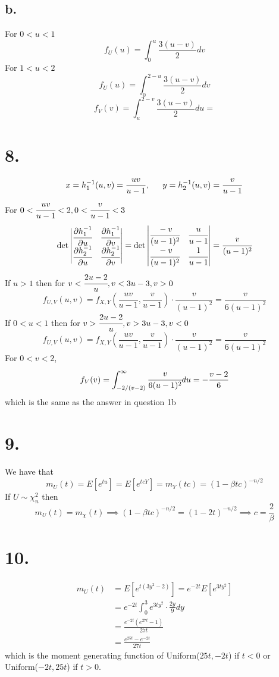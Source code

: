 \documentclass[11pt]{article}
\begin{document}
\subsection*{b.}
For $0<u<1$
\[
    f_U(u) =  \int_0^{u} \frac{3(u-v)}{2} dv
\]
For $1<u<2$
\[
    f_U(u) =  \int_0^{2-u} \frac{3(u-v)}{2} dv
\]
\[
    f_V(v) = \int_u^{2-v} \frac{3(u-v)}{2} du =
\]
\pagebreak
\section*{8.}
\[
    x = h_1^{-1}(u,v) = \frac{uv}{u-1}, \indent y = h_2^{-1}(u,v) = \frac{v}{u-1}
\]
For $0<\cfrac{uv}{u-1}<2, 0<\cfrac{v}{u-1}<3$ 
\[
    \det 
    \begin{vmatrix}
        \cfrac{\partial h_1^{-1}}{\partial u} & \cfrac{\partial h_1^{-1}}{\partial v} \\
        \cfrac{\partial h_2^{-1}}{\partial u} & \cfrac{\partial h_2^{-1}}{\partial v}
    \end{vmatrix}    
    = 
    \det 
    \begin{vmatrix}
        \cfrac{-v}{(u-1)^2} & \cfrac{u}{u-1} \\
        \cfrac{-v}{(u-1)^2} & \cfrac{1}{u-1} 
    \end{vmatrix}
    = \cfrac{v}{(u-1)^2}
\]
If $u>1$ then for $v<\cfrac{2u-2}{u}, v < 3u-3, v>0$ 
\[
    f_{U,V}(u,v) = f_{X,Y}\left(\frac{uv}{u-1}, \frac{v}{u-1}\right) \cdot \frac{v}{(u-1)^2} = \frac{v}{6(u-1)^2}
\]
If $0<u<1$ then for $v>\cfrac{2u-2}{u}, v>3u-3, v<0$
\[
    f_{U,V}(u,v) = f_{X,Y}\left(\frac{uv}{u-1}, \frac{v}{u-1}\right) \cdot \frac{v}{(u-1)^2} = \frac{v}{6(u-1)^2}
\]
For $0<v<2$, 
\[
    f_V(v) = \int_{-2/(v-2)}^\infty \cfrac{v}{6(u-1)^2} du  = -\frac{v-2}{6}
\]
which is the same as the answer in question 1b
\pagebreak
\section*{9.}
We have that
\[
    m_U(t) = E[e^{tu}] = E[e^{tcY}] = m_Y(tc) = (1-\beta tc)^{-n/2}
\]
If $U \sim \chi_n^2$ then
\[
    m_U(t) = m_\chi(t) \implies (1-\beta tc)^{-n/2} = (1-2t)^{-n/2} \implies c = \frac{2}{\beta}  
\]
\pagebreak
\section*{10.}
\begin{equation*}
    \begin{aligned}
        m_U(t) &= E[e^{t(3y^2-2)}] = e^{-2t}E[e^{3ty^2}] \\
        &= e^{-2t} \int_0^3 e^{3ty^2} \cdot \frac{2y}{9} dy \\
        &= \frac{e^{-2t} (e^{27t}-1)}{27t} \\
        &= \frac{e^{25t} - e^{-2t}}{27t}          
    \end{aligned}
\end{equation*}
which is the moment generating function of Uniform($25t, -2t$) if $t<0$ or Uniform($-2t, 25t$) if $t>0$.
\pagebreak
\end{document}
